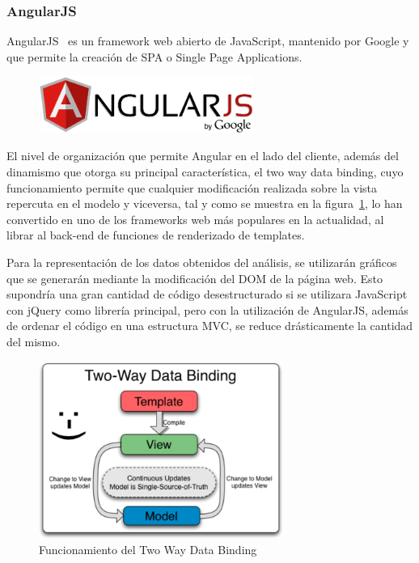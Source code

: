 \documentclass[a4paper, spanish, 12pt]{book}
\begin{document}
\subsubsection*{AngularJS}
\label{subsec:angularjs}

AngularJS~\cite{angular} es un framework web abierto de JavaScript, mantenido por Google y que
permite la creaci\'on de SPA o Single Page Applications.

\begin{figure}[H]
  \centering
  \includegraphics[width=7cm, keepaspectratio]{img/angular-logo}
\end{figure}

El nivel de organizaci\'on que permite Angular en el lado del cliente, adem\'as del
dinamismo que otorga su principal caracter\'istica, el two way data binding, cuyo
funcionamiento permite que cualquier modificaci\'on realizada sobre la vista
repercuta en el modelo y viceversa, tal y como se muestra en la figura~\ref{fig:2waydatabinding},
lo han convertido en uno de los frameworks web m\'as populares en la actualidad,
al librar al back-end de funciones de renderizado de templates.

Para la representaci\'on de los datos obtenidos del an\'alisis, se utilizar\'an
gr\'aficos que se generar\'an mediante la modificaci\'on del DOM de la p\'agina web.
Esto supondr\'ia una gran cantidad de c\'odigo desestructurado si se utilizara JavaScript con jQuery
como librer\'ia principal, pero con la utilizaci\'on de AngularJS, adem\'as de
ordenar el c\'odigo en una estructura MVC, se reduce dr\'asticamente la cantidad
del mismo.

\begin{figure}[H]
    \centering
    \includegraphics[width=8cm, keepaspectratio]{img/2waydatabinding}
    \caption{Funcionamiento del Two Way Data Binding}
    \label{fig:2waydatabinding}
\end{figure}
\end{document}
